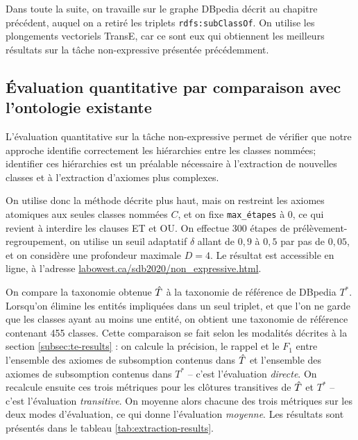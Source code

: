 Dans toute la suite, on travaille sur le graphe DBpedia décrit au chapitre précédent, auquel on a retiré les triplets \texttt{rdfs:subClassOf}. %
On utilise les plongements vectoriels TransE, car ce sont eux qui obtiennent les meilleurs résultats sur la tâche non-expressive présentée précédemment.



\subsection{Évaluation quantitative par comparaison avec l'ontologie existante}
\label{subsec:texp-reslts-quant}

L'évaluation quantitative sur la tâche non-expressive permet de vérifier que notre approche identifie correctement les hiérarchies entre les classes nommées; identifier ces hiérarchies est un préalable nécessaire à l'extraction de nouvelles classes et à l'extraction d'axiomes plus complexes.

On utilise donc la méthode décrite plus haut, mais on restreint les axiomes atomiques aux seules classes nommées $C$, et on fixe \texttt{max\_étapes} à $0$, ce qui revient à interdire les clauses ET et OU. On effectue 300 étapes de prélèvement-regroupement, on utilise un seuil adaptatif $\delta$ allant de $0,9$ à $0,5$ par pas de $0,05$, et on considère une profondeur maximale $D=4$. Le résultat est accessible en ligne, à l'adresse \href{http://labowest.ca/sdb2020/non_expressive.html}{labowest.ca/sdb2020/non\_expressive.html}.

On compare la taxonomie obtenue $\hat{T}$ à la taxonomie de référence de DBpedia $T^*$. Lorsqu'on élimine les entités impliquées dans un seul triplet, et que l'on ne garde que les classes ayant au moins une entité, on obtient une taxonomie de référence contenant 455 classes. Cette comparaison se fait selon les modalités décrites à la section \ref{subsec:te-results} : on calcule la précision, le rappel et le $F_1$ entre l'ensemble des axiomes de subsomption contenus dans $\hat{T}$ et l'ensemble des axiomes de subsomption contenus dans $T^*$ – c'est l'évaluation \textit{directe}. On recalcule ensuite ces trois métriques pour les clôtures transitives de $\hat{T}$ et $T^*$ – c'est l'évaluation \textit{transitive}. On moyenne alors chacune des trois métriques sur les deux modes d'évaluation, ce qui donne l'évaluation \textit{moyenne}. Les résultats sont présentés dans le tableau \ref{tab:extraction-results}.

